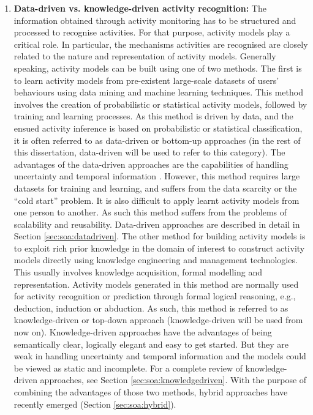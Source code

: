\begin{enumerate}
 \item \textbf{Data-driven vs. knowledge-driven activity recognition:} The information obtained through activity monitoring has to be structured and processed to recognise activities. For that purpose, activity models play a critical role. In particular, the mechanisms activities are recognised are closely related to the nature and representation of activity models. Generally speaking, activity models can be built using one of two methods. The first is to learn activity models from pre-existent large-scale datasets of users’ behaviours using data mining and machine learning techniques. This method involves the creation of probabilistic or statistical activity models, followed by training and learning processes. As this method is driven by data, and the ensued activity inference is based on probabilistic or statistical classification, it is often referred to as data-driven or bottom-up approaches (in the rest of this dissertation, data-driven will be used to refer to this category). The advantages of the data-driven approaches are the capabilities of handling uncertainty and temporal information \cite{Brand1997}. However, this method requires large datasets for training and learning, and suffers from the data scarcity or the “cold start” problem. It is also difficult to apply learnt activity models from one person to another. As such this method suffers from the problems of scalability and reusability. Data-driven approaches are described in detail in Section \ref{sec:soa:datadriven}. The other method for building activity models is to exploit rich prior knowledge in the domain of interest to construct activity models directly using knowledge engineering and management technologies. This usually involves knowledge acquisition, formal modelling and representation. Activity models generated in this method are normally used for activity recognition or prediction through formal logical reasoning, e.g., deduction, induction or abduction. As such, this method is referred to as knowledge-driven or top-down approach (knowledge-driven will be used from now on). Knowledge-driven approaches have the advantages of being semantically clear, logically elegant and easy to get started. But they are weak in handling uncertainty and temporal information and the models could be viewed as static and incomplete. For a complete review of knowledge-driven approaches, see Section \ref{sec:soa:knowledgedriven}. With the purpose of combining the advantages of those two methods, hybrid approaches have recently emerged (Section \ref{sec:soa:hybrid}). 
\end{enumerate}

